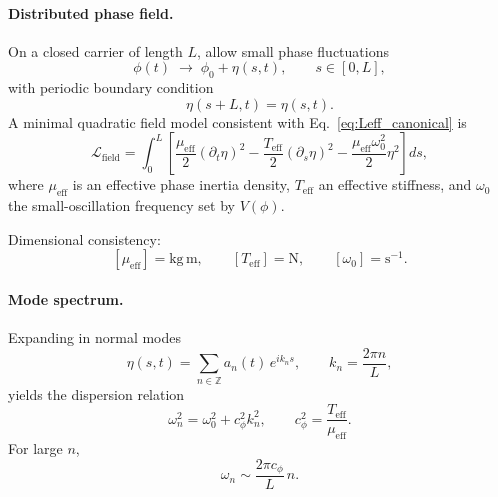 \documentclass[11pt]{article}
\begin{document}
    \paragraph{Distributed phase field.}
        On a closed carrier of length $L$, allow small phase fluctuations
        \begin{equation}
            \phi(t) \;\longrightarrow\; \phi_0 + \eta(s,t),
            \qquad s\in[0,L],
        \end{equation}
        with periodic boundary condition
        \begin{equation}
            \eta(s+L,t)=\eta(s,t).
        \end{equation}
        A minimal quadratic field model consistent with Eq.~\eqref{eq:Leff_canonical} is
        \begin{equation}
            \mathcal{L}_{\mathrm{field}}
            =
            \int_0^L
            \left[
                \frac{\mu_{\mathrm{eff}}}{2}(\partial_t \eta)^2
            -
                \frac{T_{\mathrm{eff}}}{2}(\partial_s \eta)^2
            -
                \frac{\mu_{\mathrm{eff}}\omega_0^2}{2}\eta^2
            \right] ds,
            \label{eq:field_model}
        \end{equation}
        where $\mu_{\mathrm{eff}}$ is an effective phase inertia density, $T_{\mathrm{eff}}$ an effective stiffness, and $\omega_0$ the small-oscillation frequency set by $V(\phi)$.
        
        Dimensional consistency:
        \[
            [\mu_{\mathrm{eff}}]=\mathrm{kg\,m},\qquad
            [T_{\mathrm{eff}}]=\mathrm{N},\qquad
            [\omega_0]=\mathrm{s^{-1}}.
        \]

    \paragraph{Mode spectrum.}
        Expanding in normal modes
        \begin{equation}
            \eta(s,t) = \sum_{n\in\mathbb{Z}} a_n(t)\, e^{i k_n s},
            \qquad
            k_n = \frac{2\pi n}{L},
        \end{equation}
        yields the dispersion relation
        \begin{equation}
            \boxed{
                \omega_n^2
                =
                \omega_0^2
                +
                c_\phi^2 k_n^2,
                \qquad
                c_\phi^2 = \frac{T_{\mathrm{eff}}}{\mu_{\mathrm{eff}}}.
            }
            \label{eq:dispersion}
        \end{equation}
        For large $n$,
        \begin{equation}
            \omega_n \sim \frac{2\pi c_\phi}{L}\, n.
            \label{eq:asymptotic_linear}
        \end{equation}
\end{document}
